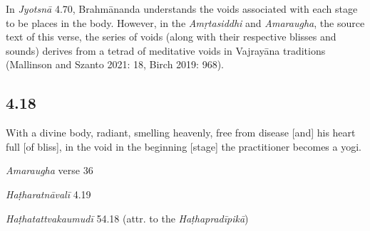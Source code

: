 \begin{ekdosis}
\begin{philcomm}[hp04_017]
In \emph{Jyotsnā} 4.70, Brahmānanda understands the voids associated with each stage to be places in the body. However, in the \emph{Amṛtasiddhi} and \emph{Amaraugha}, the source text of this verse, the series of voids (along with their respective blisses and sounds) derives from a tetrad of meditative voids in Vajrayāna traditions (Mallinson and Szanto 2021: 18, Birch 2019: 968). 
\end{philcomm}

\subsection*{4.18}
\begin{translation}[hp04_018]
With a divine body, radiant, smelling heavenly, free from disease [and] his heart full [of bliss], in the void in the beginning [stage] the practitioner becomes a yogi.

\end{translation}

\begin{sources}[hp04_018]
\emph{Amaraugha} verse 36
\begin{versinnote}
\tl{\var{°hṛdaye ] \emph{Amaraugha}, °hṛdayaḥ \emph{Amaraughaprabodha}}\\!}
\end{versinnote}
\end{sources}

\begin{testimonia}[hp04_018]
\emph{Haṭharatnāvalī} 4.19
\begin{versinnote}
\end{versinnote}

\emph{Haṭhatattvakaumudī} 54.18 (attr. to the \emph{Haṭhapradīpikā})
\begin{versinnote}
\end{versinnote}
\end{testimonia}


\end{ekdosis}
